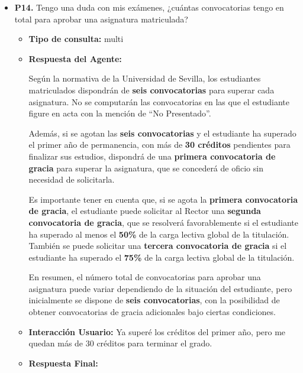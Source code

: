 \documentclass{article}
\begin{document}
\begin{itemize}
\begin{itemize}
                        Sin embargo, como el máximo de puntos para este apartado es de 50, la puntuación final sería de 50 puntos.

                        Es importante tener en cuenta que la puntuación final dependerá de la evaluación de la comisión y del baremo establecido por la Universidad de Sevilla. Es recomendable consultar el baremo y las instrucciones de evaluación para obtener más información sobre el cálculo de puntos y los criterios de evaluación.
                  \item \textbf{Contexto utilizado:}

            \end{itemize}

      \item \textbf{P14.} Tengo una duda con mis exámenes, ¿cuántas convocatorias tengo en total para aprobar una asignatura matriculada? \\
            \begin{itemize}
                  \item \textbf{Tipo de consulta:} multi
                  \item \textbf{Respuesta del Agente:}

                        Según la normativa de la Universidad de Sevilla, los estudiantes matriculados dispondrán de \textbf{seis convocatorias} para superar cada asignatura. No se computarán las convocatorias en las que el estudiante figure en acta con la mención de “No Presentado”.

                        Además, si se agotan las \textbf{seis convocatorias} y el estudiante ha superado el primer año de permanencia, con más de \textbf{30 créditos} pendientes para finalizar sus estudios, dispondrá de una \textbf{primera convocatoria de gracia} para superar la asignatura, que se concederá de oficio sin necesidad de solicitarla.

                        Es importante tener en cuenta que, si se agota la \textbf{primera convocatoria de gracia}, el estudiante puede solicitar al Rector una \textbf{segunda convocatoria de gracia}, que se resolverá favorablemente si el estudiante ha superado al menos el \textbf{50\%} de la carga lectiva global de la titulación. También se puede solicitar una \textbf{tercera convocatoria de gracia} si el estudiante ha superado el \textbf{75\%} de la carga lectiva global de la titulación.

                        En resumen, el número total de convocatorias para aprobar una asignatura puede variar dependiendo de la situación del estudiante, pero inicialmente se dispone de \textbf{seis convocatorias}, con la posibilidad de obtener convocatorias de gracia adicionales bajo ciertas condiciones.
                  \item \textbf{Interacción Usuario:} Ya superé los créditos del primer año, pero me quedan más de 30 créditos para terminar el grado.
                  \item \textbf{Respuesta Final:}


\end{itemize}
\end{itemize}
\end{document}
